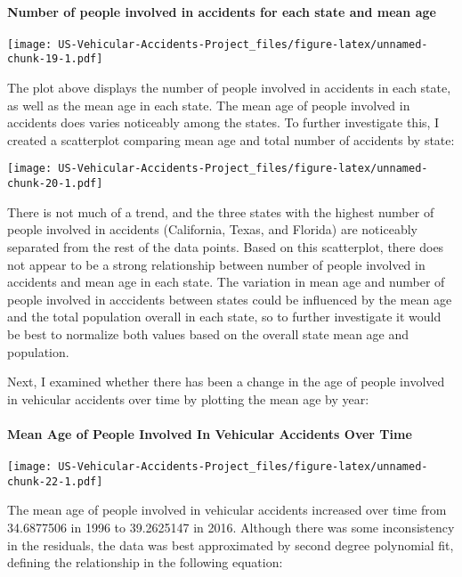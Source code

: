 \documentclass[]{article}
\let\oldparagraph\paragraph
\renewcommand{\paragraph}[1]{\oldparagraph{#1}\mbox{}}
\begin{document}
\hypertarget{number-of-people-involved-in-accidents-for-each-state-and-mean-age}{%
\paragraph{Number of people involved in accidents for each state and
mean
age}\label{number-of-people-involved-in-accidents-for-each-state-and-mean-age}}

\texttt{[image: US-Vehicular-Accidents-Project\_files/figure-latex/unnamed-chunk-19-1.pdf]}

The plot above displays the number of people involved in accidents in
each state, as well as the mean age in each state. The mean age of
people involved in accidents does varies noticeably among the states. To
further investigate this, I created a scatterplot comparing mean age and
total number of accidents by state:

\texttt{[image: US-Vehicular-Accidents-Project\_files/figure-latex/unnamed-chunk-20-1.pdf]}

There is not much of a trend, and the three states with the highest
number of people involved in accidents (California, Texas, and Florida)
are noticeably separated from the rest of the data points. Based on this
scatterplot, there does not appear to be a strong relationship between
number of people involved in accidents and mean age in each state. The
variation in mean age and number of people involved in acccidents
between states could be influenced by the mean age and the total
population overall in each state, so to further investigate it would be
best to normalize both values based on the overall state mean age and
population.

Next, I examined whether there has been a change in the age of people
involved in vehicular accidents over time by plotting the mean age by
year:

\hypertarget{mean-age-of-people-involved-in-vehicular-accidents-over-time}{%
\paragraph{Mean Age of People Involved In Vehicular Accidents Over
Time}\label{mean-age-of-people-involved-in-vehicular-accidents-over-time}}

\texttt{[image: US-Vehicular-Accidents-Project\_files/figure-latex/unnamed-chunk-22-1.pdf]}

The mean age of people involved in vehicular accidents increased over
time from 34.6877506 in 1996 to 39.2625147 in 2016. Although there was
some inconsistency in the residuals, the data was best approximated by
second degree polynomial fit, defining the relationship in the following
equation:
\end{document}
